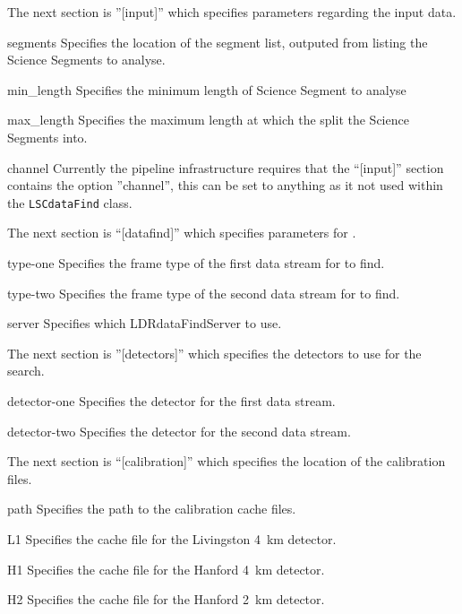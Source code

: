 \begin{entry}
The next section is ''[input]'' which specifies parameters regarding
the input data.
\begin{entry}
\item[segments]
Specifies the location of the segment list, outputed from
 listing the Science Segments to analyse.
\item[min\_length]
Specifies the minimum length of Science Segment to analyse
\item[max\_length]
Specifies the maximum length at which the split the Science Segments
into.
\item[channel]
Currently the pipeline infrastructure requires that the ``[input]''
section contains the option ''channel'', this can be set to anything as
it not used within the \texttt{LSCdataFind} class.
\end{entry}

The next section is ``[datafind]'' which specifies parameters for
.
\begin{entry}
\item[type-one]
Specifies the frame type of the first data stream for 
to find.
\item[type-two]
Specifies the frame type of the second data stream for
 to find.
\item[server]
Specifies which LDRdataFindServer to use.
\end{entry}

The next section is ''[detectors]'' which specifies the detectors to use
for the search.
\begin{entry}
\item[detector-one]
Specifies the detector for the first data stream.
\item[detector-two]
Specifies the detector for the second data stream.
\end{entry}

The next section is ``[calibration]'' which specifies the location of
the calibration files.
\begin{entry}
\item[path]
Specifies the path to the calibration cache files.
\item[L1]
Specifies the cache file for the Livingston 4~km detector.
\item[H1]
Specifies the cache file for the Hanford 4~km detector.
\item[H2]
Specifies the cache file for the Hanford 2~km detector.
\end{entry}


\end{entry}
